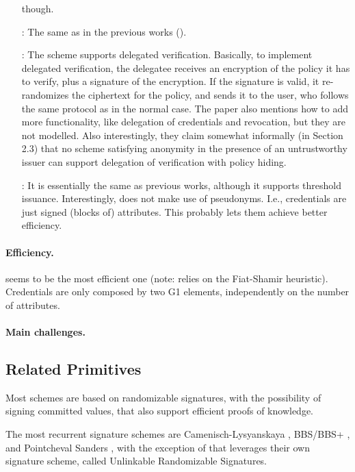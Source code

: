 \begin{enumerate}
  though.
\item[\cite{cdhk15}:] The same as in the previous works (\cite{cl01,cl02,cl04}).
\item[\cite{dmm+18}:] The scheme supports delegated verification. Basically,
  to implement delegated verification, the delegatee receives an encryption of
  the policy it has to verify, plus a signature of the encryption. If the
  signature is valid, it re-randomizes the ciphertext for the policy, and
  sends it to the user, who follows the same protocol as in the normal case.
  The paper also mentions how to add more functionality, like delegation of
  credentials and revocation, but they are not modelled. Also interestingly,
  they claim somewhat informally (in Section 2.3) that no scheme satisfying
  anonymity in the presence of an untrustworthy issuer can support delegation
  of verification with policy hiding.
\item[\cite{sms+19}:] It is essentially the same as previous works, although it
  supports threshold issuance. Interestingly, \cite{sms+19} does not make use
  of pseudonyms. I.e., credentials are just signed (blocks of) attributes. This
  probably lets them achieve better efficiency. 
\end{enumerate}

\paragraph{Efficiency.}

\cite{sms+19} seems to be the most efficient one (note: relies on the
Fiat-Shamir heuristic). Credentials are only composed by two G1 elements,
independently on the number of attributes.

\paragraph{Main challenges.}

\subsection{Related Primitives}

Most schemes \cite{cl01,cl02,cl04,cdhk15,sms+19} are based on randomizable
signatures, with the possibility of signing committed values, that also support
efficient proofs of knowledge.

The most recurrent signature schemes are Camenisch-Lysyanskaya \cite{cl02,cl04},
BBS/BBS+ \cite{asm06,cdl16b}, and Pointcheval Sanders \cite{ps16}, with the
exception of \cite{cdhk15} that leverages their own signature scheme, called
Unlinkable Randomizable Signatures.

